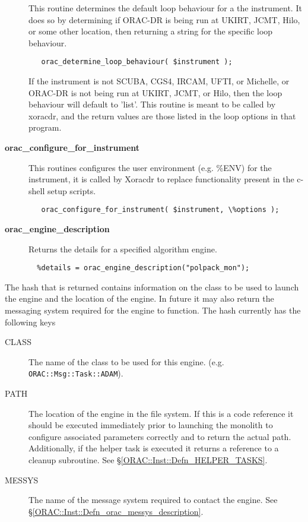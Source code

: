 \begin{description}
This routine determines the default loop behaviour for a the instrument.
It does so by determining if ORAC-DR is being run at UKIRT, JCMT, Hilo,
or some other location, then returning a string for the specific loop
behaviour.

\begin{verbatim}
   orac_determine_loop_behaviour( $instrument );
\end{verbatim}


If the instrument is not SCUBA, CGS4, IRCAM, UFTI, or Michelle, or
ORAC-DR is not being run at UKIRT, JCMT, or Hilo, then the loop behaviour
will default to 'list'. This routine is meant to be called by xoracdr,
and the return values are those listed in the loop options in that
program.


\item[\textbf{orac\_configure\_for\_instrument}] \mbox{}

This routines configures the user environment (e.g. \%ENV) for the instrument, 
it is called by Xoracdr to replace functionality present in the c-shell setup scripts.

\begin{verbatim}
   orac_configure_for_instrument( $instrument, \%options );
\end{verbatim}

\item[\textbf{orac\_engine\_description}] \mbox{}

Returns the details for a specified algorithm engine.

\begin{verbatim}
  %details = orac_engine_description("polpack_mon");
\end{verbatim}

\end{description}

The hash that is returned contains information on the
class to be used to launch the engine and the location
of the engine. In future it may also return the messaging
system required for the engine to function. The hash currently
has the following keys

\begin{description}

\item[CLASS] \mbox{}

The name of the class to be used for this engine.
(e.g. \texttt{ORAC::Msg::Task::ADAM}).


\item[PATH] \mbox{}

The location of the engine in the file system. If this
is a code reference it should be executed immediately
prior to launching the monolith to configure associated
parameters correctly and to return the actual path.
Additionally, if the helper task is executed it returns
a reference to a cleanup subroutine. See \S\ref{ORAC::Inst::Defn_HELPER_TASKS}.


\item[MESSYS] \mbox{}

The name of the message system required to contact the engine.
See \S\ref{ORAC::Inst::Defn_orac_messys_description}.

\end{description}


